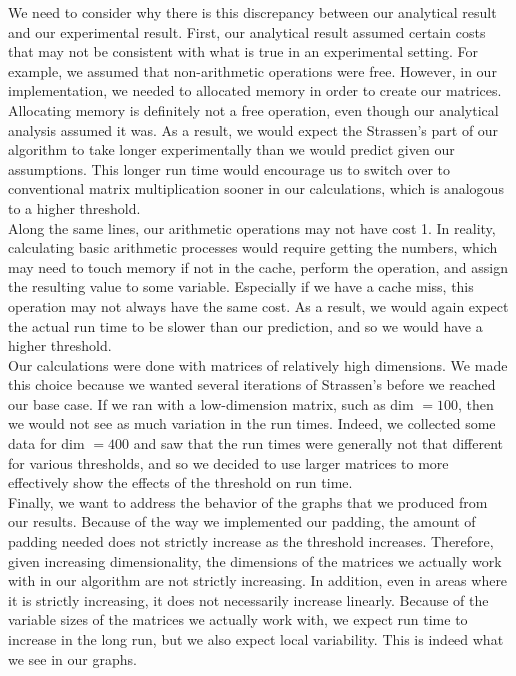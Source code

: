 \documentclass[12pt]{article}
\begin{document}
We need to consider why there is this discrepancy between our analytical result and our experimental result. First, our analytical result assumed certain costs that may not be consistent with what is true in an experimental setting. For example, we assumed that non-arithmetic operations were free. However, in our implementation, we needed to allocated memory in order to create our matrices. Allocating memory is definitely not a free operation, even though our analytical analysis assumed it was. As a result, we would expect the Strassen's part of our algorithm to take longer experimentally than we would predict given our assumptions. This longer run time would encourage us to switch over to conventional matrix multiplication sooner in our calculations, which is analogous to a higher threshold. \\

Along the same lines, our arithmetic operations may not have cost 1. In reality, calculating basic arithmetic processes would require getting the numbers, which may need to touch memory if not in the cache, perform the operation, and assign the resulting value to some variable. Especially if we have a cache miss, this operation may not always have the same cost. As a result, we would again expect the actual run time to be slower than our prediction, and so we would have a higher threshold. \\

Our calculations were done with matrices of relatively high dimensions. We made this choice because we wanted several iterations of Strassen's before we reached our base case. If we ran with a low-dimension matrix, such as dim $= 100$, then we would not see as much variation in the run times. Indeed, we collected some data for dim $= 400$ and saw that the run times were generally not that different for various thresholds, and so we decided to use larger matrices to more effectively show the effects of the threshold on run time. \\

Finally, we want to address the behavior of the graphs that we produced from our results. Because of the way we implemented our padding, the amount of padding needed does not strictly increase as the threshold increases. Therefore, given increasing dimensionality, the dimensions of the matrices we actually work with in our algorithm are not strictly increasing. In addition, even in areas where it is strictly increasing, it does not necessarily increase linearly. Because of the variable sizes of the matrices we actually work with, we expect run time to increase in the long run, but we also expect local variability. This is indeed what we see in our graphs.
\end{document}
